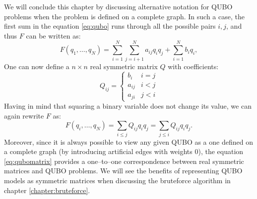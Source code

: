 We will conclude this chapter by discussing alternative notation for QUBO
problems when the problem is defined on a complete graph. In such a case, the
first sum in the equation \eqref{eq:qubo} runs through all the possible pairs
${i, j}$, and thus $F$ can be written as:
\begin{equation}
  \label{eq:qubocomplete}
  F(q_1, \ldots, q_N) =  \sum_{i=1}^N \sum_{j=i+1}^N a_{ij} q_i q_j + \sum_{i=1}^N b_iq_i,
\end{equation}
One can now define a $n \times n$ real symmetric matrix $Q$ with coefficients:
\begin{equation}
  Q_{ij} = \begin{cases}
    b_{i}  & i = j \\
    a_{ij} & i < j \\
    a_{ji} & j < i
  \end{cases}
\end{equation}
Having in mind that squaring a binary variable does not change its value, we
can again rewrite $F$ as:
\begin{equation}
  \label{eq:qubomatrix}
  F(q_{i}, \ldots, q_{N}) = \sum_{i \le j} Q_{ij} q_{i}q_{j} = \sum_{j \le i} Q_{ij} q_{i}q_{j}.
\end{equation}
Moreover, since it is always possible to view any given QUBO as a one defined
on a complete graph (by introducing artificial edges with weights 0), the
equation \eqref{eq:qubomatrix} provides a one--to--one correspondence between
real symmetric matrices and QUBO problems. We will see the benefits of
representing QUBO models as symmetric matrices when discussing the bruteforce
algorithm in chapter \ref{chapter:bruteforce}.

